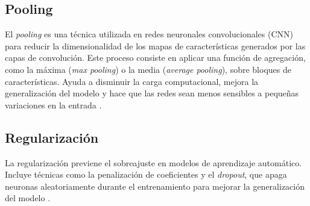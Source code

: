 \subsection{Pooling}
El \textit{pooling} es una técnica utilizada en redes neuronales convolucionales (CNN) para reducir la dimensionalidad de los mapas de características generados por las capas de convolución. Este proceso consiste en aplicar una función de agregación, como la máxima (\textit{max pooling}) o la media (\textit{average pooling}), sobre bloques de características. Ayuda a disminuir la carga computacional, mejora la generalización del modelo y hace que las redes sean menos sensibles a pequeñas variaciones en la entrada \parencite{boureau2010theoretical}.

\subsection{Regularización}
La regularización previene el sobreajuste en modelos de aprendizaje automático. Incluye técnicas como la penalización de coeficientes y el \textit{dropout}, que apaga neuronas aleatoriamente durante el entrenamiento para mejorar la generalización del modelo \parencite{srivastava2014dropout}.
